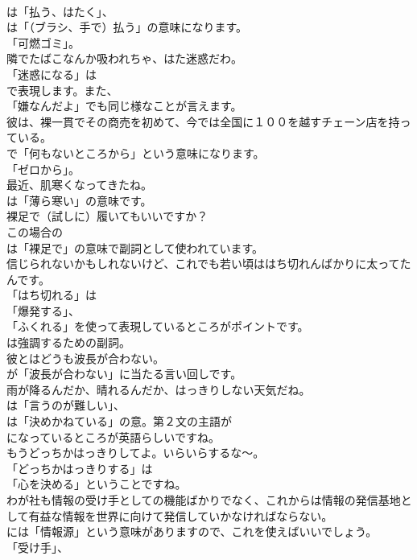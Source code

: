 \documentclass[8pt]{extreport}
\begin{document}
\begin{CJK}{UTF8}{min}
\\	は「払う、はたく」、
\\	は「（ブラシ、手で）払う」の意味になります。
\\	「可燃ゴミ」。	
\\	隣でたばこなんか吸われちゃ、はた迷惑だわ。 
\\	「迷惑になる」は
\\	で表現します。また、
\\	「嫌なんだよ」でも同じ様なことが言えます。	
\\	彼は、裸一貫でその商売を初めて、今では全国に１００を越すチェーン店を持っている。 
\\	で「何もないところから」という意味になります。
\\	「ゼロから」。	
\\	最近、肌寒くなってきたね。 
\\	は「薄ら寒い」の意味です。	
\\	裸足で（試しに）履いてもいいですか？ 
\\	この場合の
\\	は「裸足で」の意味で副詞として使われています。	
\\	信じられないかもしれないけど、これでも若い頃ははち切れんばかりに太ってたんです。 
\\	「はち切れる」は
\\	「爆発する」、
\\	「ふくれる」を使って表現しているところがポイントです。
\\	は強調するための副詞。	
\\	彼とはどうも波長が合わない。 
\\	が「波長が合わない」に当たる言い回しです。	
\\	雨が降るんだか、晴れるんだか、はっきりしない天気だね。 
\\	は「言うのが難しい」、
\\	は「決めかねている」の意。第２文の主語が
\\	になっているところが英語らしいですね。	
\\	もうどっちかはっきりしてよ。いらいらするな～。 
\\	「どっちかはっきりする」は
\\	「心を決める」ということですね。	
\\	わが社も情報の受け手としての機能ばかりでなく、これからは情報の発信基地として有益な情報を世界に向けて発信していかなければならない。 
\\	には「情報源」という意味がありますので、これを使えばいいでしょう。
\\	「受け手」、

\end{CJK}
\end{document}
